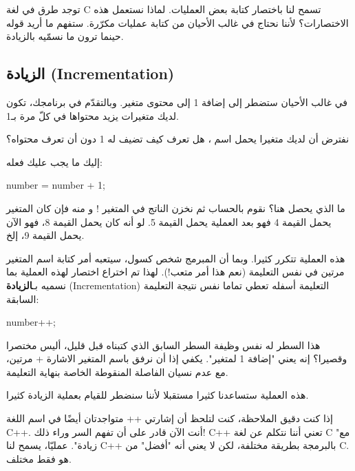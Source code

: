 توجد طرق في لغة \textenglish{C}
تسمح لنا باختصار كتابة بعض العمليات. لماذا نستعمل هذه الاختصارات؟ لأننا نحتاج في غالب الأحيان من كتابة عمليات مكرّرة. ستفهم ما أريد قوله حينما ترون ما نسمّيه بالزيادة.

\subsection{الزيادة (\textenglish{Incrementation})}

في غالب الأحيان ستضطر إلى إضافة 1 إلى محتوى متغير. وبالتقدّم في برنامجك، تكون لديك متغيرات يزيد محتواها في كلّ مرة بـ1.

نفترض أن لديك متغيرا يحمل اسم
،
هل تعرف كيف تضيف له 1 دون أن تعرف محتواه؟

إليك ما يجب عليك فعله:

\begin{Csource}
number = number + 1;
\end{Csource}

ما الذي يحصل هنا؟ نقوم بالحساب
ثم نخزن الناتج في المتغير
!
و منه فإن كان المتغير يحمل القيمة 4 فهو بعد العملية يحمل القيمة 5. لو أنه كان يحمل القيمة 8، فهو الآن يحمل القيمة 9، إلخ.

هذه العملية تتكرر كثيرا. وبما أن المبرمج شخص كسول، سيتعبه أمر كتابة اسم المتغير مرتين في نفس التعليمة (نعم هذا أمر متعب!). لهذا تم اختراع اختصار لهذه العملية بما نسميه بـ\textbf{الزيادة }
(\textenglish{Incrementation})
التعليمة أسفله تعطي تماما نفس نتيجة التعليمة السابقة:

\begin{Csource}
  number++;
\end{Csource}

هذا السطر له نفس وظيفة السطر السابق الذي كتبناه قبل قليل، أليس مختصرا وقصيرا؟ إنه يعني "إضافة 1 لمتغير". يكفي إذا أن نرفق باسم المتغير
الاشارة + مرتين، مع عدم نسيان الفاصلة المنقوطة الخاصة بنهاية التعليمة.

هذه العملية ستساعدنا كثيرا مستقبلا لأننا سنضطر للقيام بعملية الزيادة كثيرا.

\begin{information}
إذا كنت دقيق الملاحظة، كنت لتلحظ أن إشارتي
++
متواجدتان أيضًا في اسم اللغة
\textenglish{C++}.
أنت الآن قادر على أن تفهم السر وراء ذلك! \textenglish{C++}
تعني أننا نتكلم عن لغة \textenglish{C}
"مع زيادة". عمليّا، يسمح لنا \textenglish{C++}
بالبرمجة بطريقة مختلفة، لكن لا يعني أنه "أفضل" من \textenglish{C}.
هو فقط مختلف.
\end{information}

